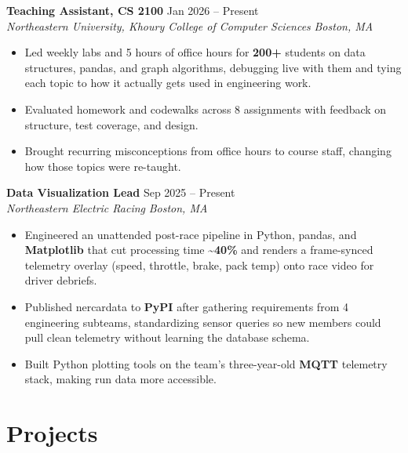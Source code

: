 \documentclass[letterpaper,10pt]{article}
\newcommand{\entrysize}{\fontsize{10.5}{12}\selectfont}
\newif\ifentrygap
\newcommand{\entrygapsize}{6pt}
\newcommand{\entryfirstgap}{0.4pt}
\newcommand{\entrysep}{\ifentrygap\vspace{\entrygapsize}\else\vspace{\entryfirstgap}\fi\global\entrygaptrue}
\let\entryorigsection\section
\renewcommand{\section}{\global\entrygapfalse\entryorigsection}
\newcommand{\entry}[4]{\entrysep{\entrysize\textbf{#1}} \hfill #2 \\ \textit{#3} \hfill \textit{#4}}
\begin{document}
\entry{Teaching Assistant, CS 2100}{Jan 2026 -- Present}
      {Northeastern University, Khoury College of Computer Sciences}{Boston, MA}
\begin{itemize}
  \item Led weekly labs and 5 hours of office hours for \textbf{200+} students on data structures, pandas, and graph algorithms,
        debugging live with them and tying each topic to how it actually gets used in engineering work.
  \item Evaluated homework and codewalks across 8 assignments with feedback on structure, test coverage, and design.
  \item Brought recurring misconceptions from office hours to course staff, changing how those topics were re-taught.
\end{itemize}

\entry{Data Visualization Lead}{Sep 2025 -- Present}
      {Northeastern Electric Racing}{Boston, MA}
\begin{itemize}
  \item Engineered an unattended post-race pipeline in Python, pandas, and \textbf{Matplotlib} that cut processing time
        \textasciitilde\textbf{40\%} and renders a frame-synced telemetry overlay (speed, throttle, brake, pack temp) onto race video for driver debriefs.
  \item Published nercardata to \textbf{PyPI} after gathering requirements from 4 engineering subteams,
        standardizing sensor queries so new members could pull clean telemetry without learning the database schema.
  \item Built Python plotting tools on the team's three-year-old \textbf{MQTT} telemetry stack, making run data more accessible.
\end{itemize}

\section{Projects}
\end{document}

